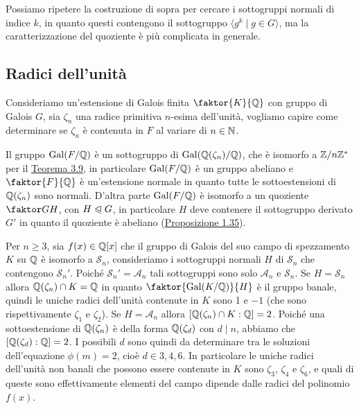 \documentclass[11pt]{scrartcl}
\begin{document}
	\begin{remark}
		Possiamo ripetere la costruzione di sopra per cercare i sottogruppi 
		normali di indice $k$, in quanto questi contengono il sottogruppo
		$\langle g^k \mid g \in G\rangle$, ma la caratterizzazione del quoziente
		è più complicata in generale.
	\end{remark}
	
	\newpage
	
	\subsection{Radici dell'unità}
	
	Consideriamo un'estensione di Galois finita $\faktor{K}{\QQ}$ con gruppo di 
	Galois $G$, sia $\zeta_n$ una radice primitiva $n$-esima dell'unità, vogliamo
	capire come determinare se $\zeta_n$ è contenuta in $F$ al variare di $n \in \mathbb N$.
	
	\begin{center}
	\end{center}
	
	Il gruppo $\operatorname{Gal}(F/\mathbb Q)$ è un sottogruppo di $\operatorname{Gal}(\mathbb Q(\zeta_n)/\mathbb Q)$, che è
	isomorfo a ${\mathbb Z}/n{\mathbb Z}^*$ per il \hyperref[teorema3.9]{Teorema 3.9}, in particolare
	$\operatorname{Gal}(F/\mathbb Q)$ è un gruppo abeliano e $\faktor{F}{\QQ}$ è un'estensione normale
	in quanto tutte le sottoestensioni di $\mathbb Q(\zeta_n)$ sono normali. D'altra 
	parte $\operatorname{Gal}(F/\mathbb Q)$ è isomorfo a un quoziente $\faktor G H$, con $H \trianglelefteqslant G$,
	in particolare $H$ deve contenere il sottogruppo derivato $G'$ in quanto
	il quoziente è abeliano (\hyperref[prop1.35]{Proposizione 1.35}).
	
	\begin{example}
		Per $n\geq 3$, sia $f(x) \in \mathbb Q[x]$ che il gruppo di Galois del suo campo di spezzamento
		$K$ su $\mathbb Q$ è isomorfo a $\mathcal{S}_n$, consideriamo i sottogruppi normali $H$ di $\mathcal{S}_n$
		che contengono $\mathcal{S}_n'$. Poiché $\mathcal{S}_n' = \mathcal{A}_n$ tali sottogruppi
		sono solo $\mathcal{A}_n$ e $\mathcal{S}_n$. Se $H = \mathcal{S}_n$ allora $\QQ(\zeta_n) \cap K = \nolinebreak\QQ$
		in quanto $\faktor{\Gal(K/\QQ)}{H}$ è il gruppo banale, quindi le uniche
		radici dell'unità contenute in $K$ sono 1 e $-1$ (che sono rispettivamente
		$\zeta_1$ e $\zeta_2$). Se $H = \mathcal{A}_n$
		allora $[\mathbb Q(\zeta_n)\cap K: \mathbb Q] = 2$. Poiché una sottoestensione di 
		$\mathbb Q(\zeta_n)$ è della forma $\mathbb Q(\zeta_d)$ con $d \mid n$, abbiamo
		che $[\mathbb Q(\zeta_d):\mathbb Q] = 2$. I possibili $d$ sono quindi da determinare
		tra le soluzioni dell'equazione $\phi(m) = 2$, cioè $d \in {3, 4, 6}$.
		In particolare le uniche radici dell'unità non banali che possono essere
		contenute in $K$ sono $\zeta_3$, $\zeta_4$ e $\zeta_6$, e quali di queste
		sono effettivamente elementi del campo dipende dalle radici del polinomio $f(x)$.
	\end{example}
	
\end{document}
